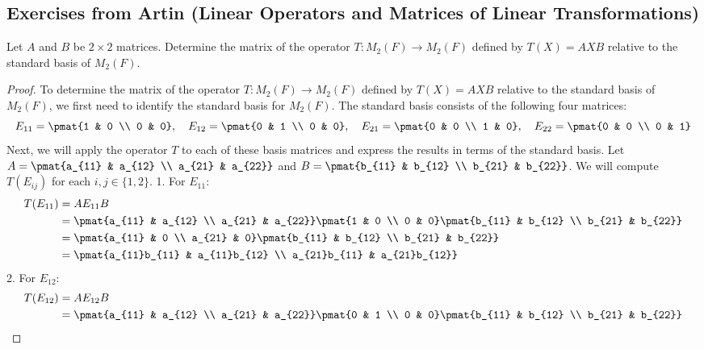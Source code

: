 \documentclass[openany]{book}
\begin{document}
\subsection{Exercises from Artin (Linear Operators and Matrices of Linear Transformations)}
\begin{exercise}
    Let $A$ and $B$ be $2 \times 2$ matrices. Determine the matrix of the operator $T: M_2(F) \to M_2(F)$ defined by $T(X) = AXB$ relative to the standard basis of $M_2(F)$.
\end{exercise}
\begin{proof}
To determine the matrix of the operator $T: M_2(F) \to M_2(F)$ defined by $T(X) = AXB$ relative to the standard basis of $M_2(F)$, we first need to identify the standard basis for $M_2(F)$. The standard basis consists of the following four matrices:
$$E_{11} = \pmat{1 & 0 \\ 0 & 0}, \quad E_{12} = \pmat{0 & 1 \\ 0 & 0}, \quad E_{21} = \pmat{0 & 0 \\ 1 & 0}, \quad E_{22} = \pmat{0 & 0 \\ 0 & 1}$$
Next, we will apply the operator $T$ to each of these basis matrices and express the results in terms of the standard basis. Let $A = \pmat{a_{11} & a_{12} \\ a_{21} & a_{22}}$ and $B = \pmat{b_{11} & b_{12} \\ b_{21} & b_{22}}$. We will compute $T(E_{ij})$ for each $i,j \in \{1,2\}$.
1. For $E_{11}$:
\[\begin{aligned}
T(E_{11}) &= A E_{11} B \\
&= \pmat{a_{11} & a_{12} \\ a_{21} & a_{22}} \pmat{1 & 0 \\ 0 & 0} \pmat{b_{11} & b_{12} \\ b_{21} & b_{22}} \\
&= \pmat{a_{11} & 0 \\ a_{21} & 0} \pmat{b_{11} & b_{12} \\ b_{21} & b_{22}} \\
&= \pmat{a_{11}b_{11} & a_{11}b_{12} \\ a_{21}b_{11} & a_{21}b_{12}}
\end{aligned}\]
2. For $E_{12}$:
\[\begin{aligned}
T(E_{12}) &= A E_{12} B \\
&= \pmat{a_{11} & a_{12} \\ a_{21} & a_{22}} \pmat{0 & 1 \\ 0 & 0} \pmat{b_{11} & b_{12} \\ b_{21} & b_{22}} \\

\end{aligned}\]
\end{proof}
\end{document}
